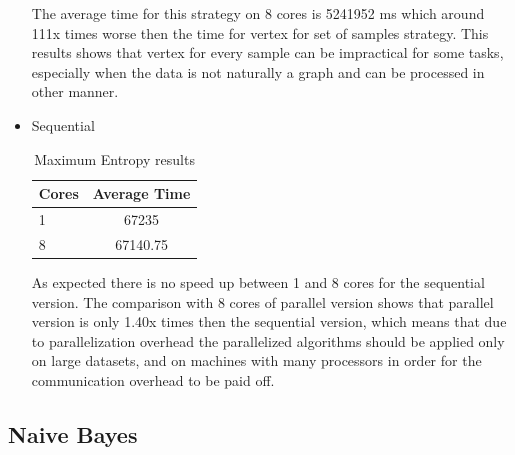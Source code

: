 \documentclass{report}
\begin{document}
\begin{itemize}
The average time for this strategy on 8 cores is 5241952 ms which around 111x times worse then the time for vertex for set of samples strategy. This results shows that vertex for every sample can be impractical for some tasks, especially when the data is not naturally a graph and can be processed in other manner.

\item{Sequential}

\begin{table}[!htb]
\centering
\begin{tabular}{ l c }
    \hline\hline
    Cores & Average Time \\ [0.2ex]
    \hline
    1 &  67235 \\
    8 & 67140.75  \\
    \hline
  \end{tabular}
\label{table:maxentres2}
\caption{Maximum Entropy results}
\end{table}

As expected there is no speed up between 1 and 8 cores for the sequential version.  The comparison with 8 cores of parallel version shows that parallel version is only 1.40x times then the sequential version, which means that due to parallelization overhead the parallelized algorithms should be applied only on large datasets, and on machines with many processors in order for the communication overhead to be paid off.

\end{itemize}

\subsection{Naive Bayes}
\end{document}
